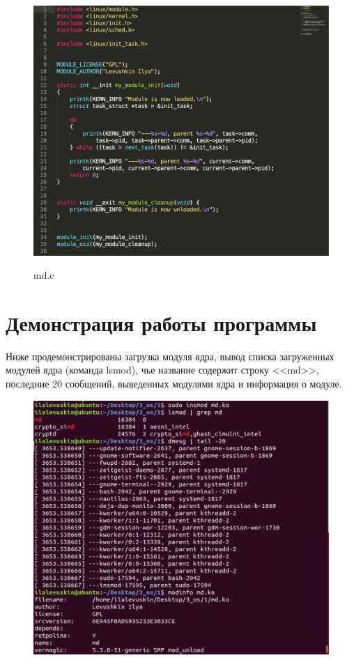 \documentclass[a4paper,12pt]{article}
\begin{document}
	\begin{figure}[h!]
		\begin{center}
			{\includegraphics[scale = 0.7]{listing_md.png}}
			\label{listing_md}
		\end{center}
		\caption{md.c}
	\end{figure}
	
	\newpage
	
	\section*{Демонстрация работы программы}
	
	Ниже продемонстрированы загрузка модуля ядра, вывод списка загруженных модулей ядра (команда lsmod), чье название содержит строку <<md>>, последние 20 сообщений, выведенных модулями ядра и информация о модуле.
	
	\begin{figure}[h!]
		\begin{center}
			{\includegraphics[scale = 0.7]{1.png}}
			\label{1}
		\end{center}
	\end{figure}
\end{document}
